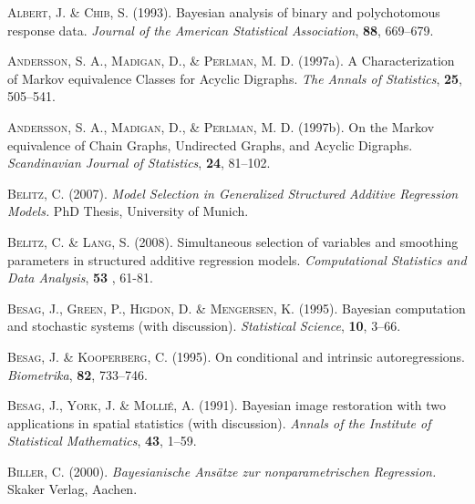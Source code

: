 
\begin{thebibliography}{99}

\label{stepwiseregreferences}

 {\scshape Albert, J. \& Chib, S.} (1993).
 Bayesian analysis of binary and polychotomous response data.
 {\it Journal of the American Statistical Association}, {\bf 88}, 669--679.

 {\scshape Andersson, S. A., Madigan, D., \& Perlman, M. D.} (1997a).
 A Characterization of Markov equivalence Classes for Acyclic Digraphs.
 {\it The Annals of Statistics}, {\bf 25}, 505--541.

 {\scshape Andersson, S. A., Madigan, D., \& Perlman, M. D.} (1997b).
 On the Markov equivalence of Chain Graphs, Undirected Graphs, and Acyclic Digraphs.
 { \it Scandinavian Journal of Statistics}, {\bf  24}, 81--102.

 {\scshape Belitz, C.} (2007).
 {\it Model Selection in Generalized Structured Additive Regression Models.}
 PhD Thesis, University of Munich.

 {\scshape Belitz, C. \& Lang, S.} (2008).
 Simultaneous selection of variables and smoothing parameters in structured additive regression models.
{\it Computational Statistics and Data Analysis}, {\bf 53} , 61-81.

 {\scshape Besag, J., Green, P., Higdon, D. \& Mengersen, K.} (1995).
 Bayesian computation and stochastic systems (with discussion).
 {\it Statistical Science}, {\bf 10}, 3--66.

 {\scshape Besag, J. \& Kooperberg, C.} (1995).
 On conditional and intrinsic autoregressions.
 {\it Biometrika}, {\bf 82}, 733--746.

 {\scshape Besag, J., York, J. \& Molli\'{e}, A.} (1991).
 Bayesian image restoration with two applications in spatial statistics (with discussion).
 {\it Annals of the Institute of Statistical Mathematics}, {\bf 43}, 1--59.

 {\scshape Biller, C.} (2000).
 {\it Bayesianische Ans\"{a}tze zur nonparametrischen Regression.}
 Skaker Verlag, Aachen.


\end{thebibliography}
